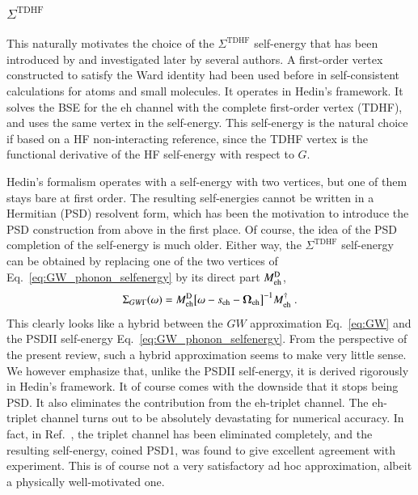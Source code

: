 \documentclass[aip,jcp,reprint,noshowkeys,superscriptaddress]{revtex4-1}
\newcommand{\eh}{\text{eh}}
\begin{document}
\subsubsection{$\Sigma^{\text{TDHF}}$}
This naturally motivates the choice of the $\Sigma^{\text{TDHF}}$ self-energy
that has been introduced by 
\citet{Maggio2017} and investigated later by several authors.
\cite{Vlcek2019,MejutoZaera2021,Vacondio2024,Bruneval2024,Patterson2024, Forster2025}
A first-order vertex constructed to satisfy the Ward identity had been
used before in self-consistent calculations for atoms and small
molecules.\cite{Kuwahara2014,Kuwahara2016}
It operates in Hedin's framework. It solves the BSE for the $\eh$ channel
with the complete first-order vertex (TDHF), and uses the same vertex in the 
self-energy. This self-energy is the natural choice if based on a HF non-interacting reference, 
since the TDHF vertex is the functional derivative of the HF self-energy with respect to $G$.

Hedin's formalism operates with a self-energy with two vertices, 
but one of them stays bare at first order. The resulting self-energies cannot be written 
in a Hermitian (PSD) resolvent form, which has been the motivation to introduce the PSD construction
from above\cite{Pavlyukh2026} in the first place. Of course, the idea of the 
PSD completion of the self-energy is much older.\cite{stefanucci2014diagrammatic} 
Either way, the $\Sigma^{\text{TDHF}}$ self-energy can be obtained by 
replacing one of
the two vertices of Eq.~\eqref{eq:GW_phonon_selfenergy} by its direct
part $M^{\rm D}_{\eh}$,
\begin{equation}
\Sigma_{GW\Gamma}(\omega)
=
M^{\rm D}_{\eh}
\big[
\omega-s_{\eh}-\boldsymbol\Omega_{\eh}
\big]^{-1}
M_{\eh}^{\dagger} \;.
\label{eq:GWGamma}
\end{equation}
This clearly looks like a hybrid between the $GW$ approximation
Eq.~\eqref{eq:GW} and the PSDII self-energy Eq.~\eqref{eq:GW_phonon_selfenergy}. 
From the perspective of the present review,
such a hybrid approximation seems to make very little sense.
We however emphasize that, unlike the PSDII self-energy, it is derived 
rigorously in Hedin's framework. It of course comes with the downside 
that it stops being PSD. It also eliminates the contribution from the 
$\eh$-triplet channel. The $\eh$-triplet channel turns out to be absolutely 
devastating for numerical accuracy. In fact, in Ref.~, the 
triplet channel has been eliminated completely, and the resulting self-energy, 
coined PSD1, was found to give excellent agreement with experiment.
This is of course not a very satisfactory ad hoc approximation, albeit a physically well-motivated one.
\end{document}
